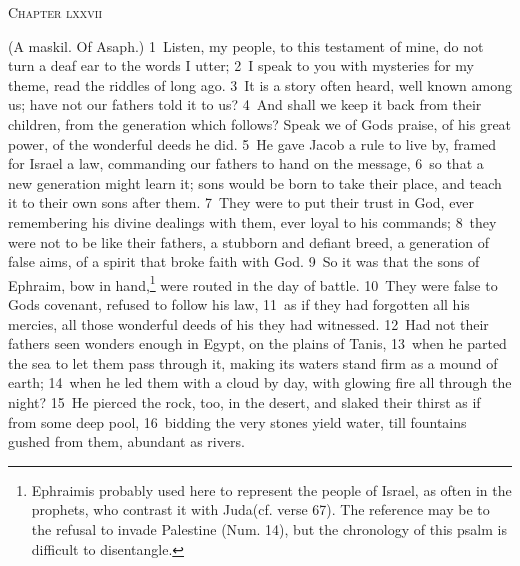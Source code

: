 \documentclass[10pt]{book} %
\begin{document}
\begin{large}\begin{center}\textsc{Chapter lxxvii}\end{center}\end{large}
(A maskil. Of Asaph.)
\textcolor{benred8}{1}~Listen, my people, to this testament of mine, do not turn a deaf ear to the words I utter; \textcolor{benred8}{2}~I speak to you with mysteries for my theme, read the riddles of long ago. \textcolor{benred8}{3}~It is a story often heard, well known among us; have not our fathers told it to us? \textcolor{benred8}{4}~And shall we keep it back from their children, from the generation which follows? Speak we of God\textquotesingle s praise, of his great power, of the wonderful deeds he did. \textcolor{benred8}{5}~He gave Jacob a rule to live by, framed for Israel a law, commanding our fathers to hand on the message, \textcolor{benred8}{6}~so that a new generation might learn it; sons would be born to take their place, and teach it to their own sons after them. \textcolor{benred8}{7}~They were to put their trust in God, ever remembering his divine dealings with them, ever loyal to his commands; \textcolor{benred8}{8}~they were not to be like their fathers, a stubborn and defiant breed, a generation of false aims, of a spirit that broke faith with God.
\textcolor{benred8}{9}~So it was that the sons of Ephraim, bow in hand,\footnote[1]{\textasciigrave Ephraim\textquotesingle  is probably used here to represent the people of Israel, as often in the prophets, who contrast it with \textasciigrave Juda\textquotesingle  (cf. verse 67). The reference may be to the refusal to invade Palestine (Num. 14), but the chronology of this psalm is difficult to disentangle.} were routed in the day of battle. \textcolor{benred8}{10}~They were false to God\textquotesingle s covenant, refused to follow his law, \textcolor{benred8}{11}~as if they had forgotten all his mercies, all those wonderful deeds of his they had witnessed. \textcolor{benred8}{12}~Had not their fathers seen wonders enough in Egypt, on the plains of Tanis, \textcolor{benred8}{13}~when he parted the sea to let them pass through it, making its waters stand firm as a mound of earth; \textcolor{benred8}{14}~when he led them with a cloud by day, with glowing fire all through the night? \textcolor{benred8}{15}~He pierced the rock, too, in the desert, and slaked their thirst as if from some deep pool, \textcolor{benred8}{16}~bidding the very stones yield water, till fountains gushed from them, abundant as rivers.
\end{document}

